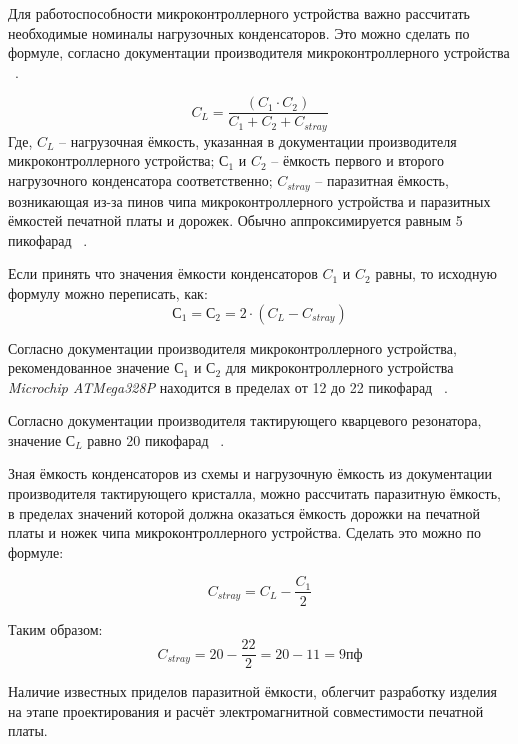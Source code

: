 Для работоспособности микроконтроллерного устройства важно рассчитать
необходимые номиналы нагрузочных конденсаторов. Это можно сделать по
формуле, согласно документации производителя микроконтроллерного
устройства ~\cite{microchip-Calculating-crystal-load-capacitor}.

\begin{equation}
  C_L = \frac{(C_1 \cdot C_2 )}{C_1 + C_2 + C_{stray}}
\end{equation}
Где,
$C_L$ – нагрузочная ёмкость, указанная в документации производителя микроконтроллерного устройства;
$С_1$ и $C_2$ – ёмкость первого и второго нагрузочного конденсатора соответственно;
$C_{stray}$ – паразитная ёмкость, возникающая из-за пинов чипа
микроконтроллерного устройства и паразитных ёмкостей печатной платы и
дорожек. Обычно аппроксимируется равным 5 пикофарад ~\cite{microchip-Calculating-crystal-load-capacitor}.

Если принять что значения ёмкости конденсаторов $C_1$ и $C_2$ равны,
то исходную формулу можно переписать, как:
\begin{equation}
  С_1 = С_2 = 2 \cdot (C_L - C_{stray})
\end{equation}


Согласно документации производителя микроконтроллерного устройства,
рекомендованное значение $С_1$ и $С_2$ для микроконтроллерного
устройства \textit{Microchip ATMega328P} находится в пределах от 12 до
22 пикофарад ~\cite{microchip-atmega328p-datasheet}.

Согласно документации производителя тактирующего кварцевого резонатора, значение $С_L$ 
равно 20 пикофарад ~\cite{crystal-datasheet}.



Зная ёмкость конденсаторов из схемы и нагрузочную ёмкость из
документации производителя тактирующего кристалла, можно
рассчитать паразитную ёмкость, в пределах значений которой должна
оказаться ёмкость дорожки на печатной платы и ножек чипа
микроконтроллерного устройства. Сделать это можно по формуле:

\begin{equation}
  C_{stray} = C_L - \frac{C_1}{2}
\end{equation}

Таким образом:
$$C_{stray} = 20 - \frac{22}{2} = 20 - 11 = 9пф$$

Наличие известных приделов паразитной ёмкости, облегчит разработку
изделия на этапе проектирования и расчёт электромагнитной
совместимости печатной платы.

\newpage

